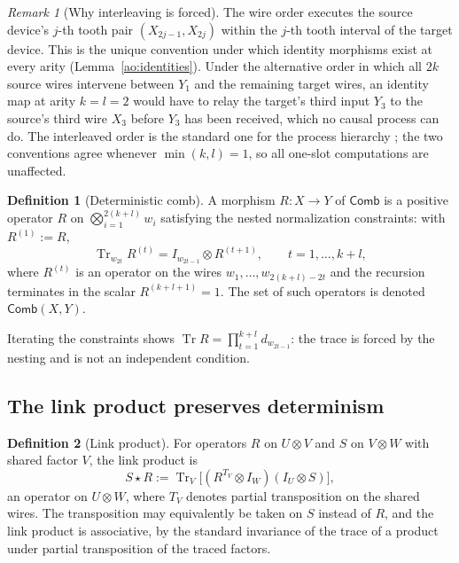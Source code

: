 \documentclass[11pt,a4paper]{article}
\theoremstyle{definition}
\newtheorem{definition}{Definition}[section]
\theoremstyle{plain}
\theoremstyle{remark}
\newtheorem{remark}[theorem]{Remark}
\DeclareMathOperator{\Tr}{Tr}
\newcommand{\Comb}{\mathsf{Comb}}
\begin{document}
\begin{remark}[Why interleaving is forced]
\label{ao:why-interleave}
The wire order executes the source device's $j$-th tooth pair
$(X_{2j-1},X_{2j})$ within the $j$-th tooth interval of the target device.
This is the unique convention under which identity morphisms exist at every
arity (Lemma~\ref{ao:identities}). Under the alternative order in which all
$2k$ source wires intervene between $Y_1$ and the remaining target wires, an
identity map at arity $k=l=2$ would have to relay the target's third input
$Y_3$ to the source's third wire $X_3$ before $Y_3$ has been received, which
no causal process can do. The interleaved order is the standard one for the
process hierarchy \cite{chiribella2013,bisioperinotti2019}; the two conventions
agree whenever $\min(k,l)=1$, so all one-slot computations are unaffected.
\end{remark}

\begin{definition}[Deterministic comb]
\label{ao:detcomb}
A morphism $R:X\to Y$ of $\Comb$ is a positive operator $R$ on
$\bigotimes_{i=1}^{2(k+l)} w_i$ satisfying the nested normalization
constraints: with $R^{(1)}:=R$,
\[
\Tr_{w_{2t}} R^{(t)} = I_{w_{2t-1}}\otimes R^{(t+1)},
\qquad t=1,\dots,k+l,
\]
where $R^{(t)}$ is an operator on the wires $w_1,\dots,w_{2(k+l)-2t}$ and
the recursion terminates in the scalar $R^{(k+l+1)}=1$. The set of such
operators is denoted $\Comb(X,Y)$.
\end{definition}

Iterating the constraints shows $\Tr R=\prod_{t=1}^{k+l} d_{w_{2t-1}}$: the
trace is forced by the nesting and is not an independent condition.

\subsection{The link product preserves determinism}
\label{ao:linkprod}

\begin{definition}[Link product]
For operators $R$ on $U\otimes V$ and $S$ on $V\otimes W$ with shared factor
$V$, the link product is
\[
S\star R := \Tr_{V}\!\bigl[(R^{T_V}\otimes I_W)(I_U\otimes S)\bigr],
\]
an operator on $U\otimes W$, where $T_V$ denotes partial transposition on
the shared wires. The transposition may equivalently be taken on $S$
instead of $R$, and the link product is associative, by the standard
invariance of the trace of a product under partial transposition of the
traced factors.
\end{definition}
\end{document}

